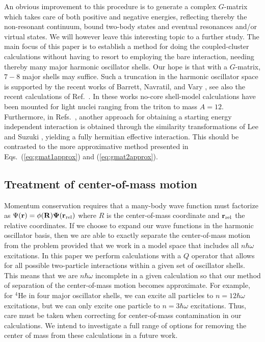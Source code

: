 An obvious improvement to this procedure is to generate a complex $G$-matrix which takes care
of both positive and negative energies, reflecting thereby the non-resonant continuum, bound two-body
states and eventual resonances and/or virtual states. We will however leave this interesting topic
to a further study. The main focus of this paper is to establish a method for doing
the coupled-cluster calculations without having to resort to employing the bare interaction,
needing thereby  many major harmonic oscillator shells. Our hope is that with a $G$-matrix, 
$7-8$ major shells may suffice. 
Such a truncation in the harmonic oscillator space is supported by the recent works of
Barrett, Navratil, and Vary \cite{bruce1,bruce2,bruce3}, 
see also the recent calculations
of Ref.~\cite{petr_erich02}. In these works no-core shell-model calculations have 
been mounted
for light nuclei ranging from the triton to mass $A=12$. 
Furthermore, in Refs.~\cite{bruce1,bruce2},
another approach for obtaining a starting energy independent interaction is obtained through
the similarity transformations of Lee and Suzuki \cite{ls0,ls1}, 
yielding a fully hermitian
effective interaction. This should be contrasted to the more 
approximative method presented 
in Eqs.~(\ref{eq:gmat1approx}) and (\ref{eq:gmat2approx}).


\subsection{Treatment of center-of-mass motion}

Momentum conservation requires 
that a many-body wave function must factorize
as $\Psi(\bf{r}) = \phi(R)\Psi(\bf{r}_{\rm rel})$ where 
$R$ is the center-of-mass coordinate and $\bf{r}_{\rm rel}$ the 
relative coordinates. If we choose to expand our wave functions in
the harmonic oscillator basis, then we are able to exactly separate the
center-of-mass motion from the problem provided that we work in a model
space that includes all $n\hbar\omega$ excitations. 
In this paper we perform calculations with a $Q$ operator that allows 
for all possible two-particle interactions within a given 
set of oscillator shells.  This means that we are 
$n\hbar\omega$ incomplete in a given 
calculation so that our method of separation of the center-of-mass 
motion becomes approximate. For example, for $^4$He in four major oscillator
shells, we can excite all particles to $n=12\hbar\omega$ excitations, 
but we can only excite one particle to $n=3\hbar\omega$ excitations. 
Thus, care must be taken when correcting for center-of-mass contamination
in our calculations. We intend to investigate a full range of 
options for removing the center of mass from these calculations in
a future work. 

